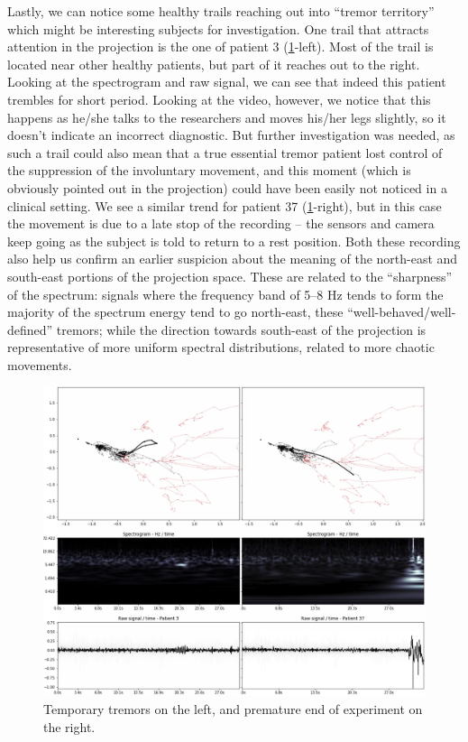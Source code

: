 Lastly, we can notice some healthy trails reaching out into ``tremor territory'' which might be interesting subjects for investigation. One trail that attracts attention in the projection is the one of patient 3 (\cref{fig:exp1-337}-left). Most of the trail is located near other healthy patients, but part of it reaches out to the right. Looking at the spectrogram and raw signal, we can see that indeed this patient trembles for short period. Looking at the video, however, we notice that this happens as he/she talks to the researchers and moves his/her legs slightly, so it doesn't indicate an incorrect diagnostic. But further investigation was needed, as such a trail could also mean that a true essential tremor patient lost control of the suppression of the involuntary movement, and this moment (which is obviously pointed out in the projection) could have been easily not noticed in a clinical setting. We see a similar trend for patient 37 (\cref{fig:exp1-337}-right), but in this case the movement is due to a late stop of the recording -- the sensors and camera keep going as the subject is told to return to a rest position. Both these recording also help us confirm an earlier suspicion about the meaning of the north-east and south-east portions of the projection space. These are related to the ``sharpness'' of the spectrum: signals where the frequency band of 5--8 Hz tends to form the majority of the spectrum energy tend to go north-east, these ``well-behaved/well-defined'' tremors; while the direction towards south-east of the projection is representative of more uniform spectral distributions, related to more chaotic movements.

\begin{figure}[ht]
\centering
\includegraphics[width=\linewidth]{figures/nemo/exp1-337.png}
\caption{Temporary tremors on the left, and premature end of experiment on the right.}
\label{fig:exp1-337}
\end{figure}

